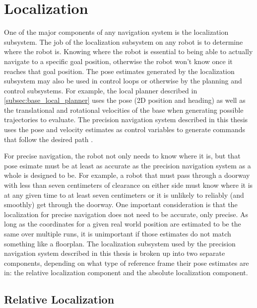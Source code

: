 \section{Localization}\label{sec:localization}

One of the major components of any navigation system is the localization subsystem. The job of the localization subsystem on any robot is to determine where the robot is. Knowing where the robot is essential to being able to actually navigate to a specific goal position, otherwise the robot won't know once it reaches that goal position. The pose estimates generated by the localization subsystem may also be used in control loops or otherwise by the planning and control subsystems. For example, the local planner described in \autoref{subsec:base_local_planner} uses the pose (2D position and heading) as well as the translational and rotational velocities of the base when generating possible trajectories to evaluate. The precision navigation system described in this thesis uses the pose and velocity estimates as control variables to generate commands that follow the desired path .

For precise navigation, the robot not only needs to know where it is, but that pose esimate must be at least as accurate as the precision navigation system as a whole is designed to be. For example, a robot that must pass through a doorway with less than seven centimeters of clearance on either side must know where it is at any given time to at least seven centimeters or it is unlikely to reliably (and smoothly) get through the doorway. One important consideration is that the localization for precise navigation does not need to be accurate, only precise. As long as the coordinates for a given real world position are estimated to be the same over multiple runs, it is unimportant if those estimates do not match something like a floorplan. The localization subsystem used by the precision navigation system described in this thesis is broken up into two separate components, depending on what type of reference frame their pose estimates are in: the relative localization component and the absolute localization component.

\subsection{Relative Localization}\label{subsec:relative_localization}

